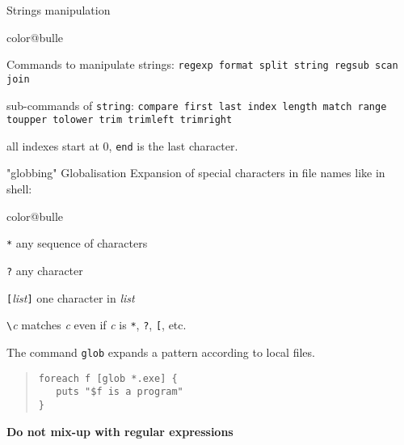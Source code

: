 \documentclass[a4paper,landscape,smooth]{show}
\begin{document}

\begin{tslide}{Strings manipulation}
   \vfill
   \begin{bitemize}{color@bulle}
      \item Commands to manipulate strings:
	 \texttt{regexp format split string regsub scan join}
      \item sub-commands of \texttt{string}:
	 \texttt{compare first last index length match range toupper tolower
	 trim trimleft trimright}
      \item all indexes start at 0, \texttt{end} is the last character.
   \end{bitemize}
   \vfill
\end{tslide}


\begin{tslide}{"globbing" Globalisation}
   \vfill
   Expansion of special characters in file names like in shell:
   \begin{bitemize}{color@bulle}
      \item \verb|*| any sequence of characters
      \item \verb|?| any character
      \item \verb|[|\emph{list}\verb|]| one character in \emph{list}
      \item \verb|\|\emph{c} matches \emph{c} even if \emph{c} is \verb|*|,
	 \verb|?|, \verb|[|, etc. 
   \end{bitemize}
   \vfill
   The command \texttt{glob} expands a pattern according to local files.
   \begin{quote}
   \begin{verbatim}
foreach f [glob *.exe] {
   puts "$f is a program"
}
   \end{verbatim} %
   \end{quote}
   \vfill
   \begin{center}
      {\bf Do not mix-up with regular expressions}
   \end{center}
   \vfill
\end{tslide}

\end{document}
